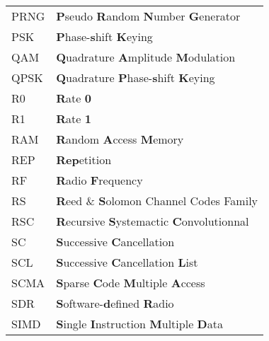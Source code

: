 \begin{center}
\begin{longtable}{ p{}  p{} }
PRNG        & \textbf{P}seudo \textbf{R}andom \textbf{N}umber \textbf{G}enerator                                              \\
PSK         & \textbf{P}hase-\textbf{s}hift \textbf{K}eying                                                                   \\
QAM         & \textbf{Q}uadrature \textbf{A}mplitude \textbf{M}odulation                                                      \\
QPSK        & \textbf{Q}uadrature \textbf{P}hase-\textbf{s}hift \textbf{K}eying                                               \\
R0          & \textbf{R}ate \textbf{0}                                                                                        \\
R1          & \textbf{R}ate \textbf{1}                                                                                        \\
RAM         & \textbf{R}andom \textbf{A}ccess \textbf{M}emory                                                                 \\
REP         & \textbf{Rep}etition                                                                                             \\
RF          & \textbf{R}adio \textbf{F}requency                                                                               \\
RS          & \textbf{R}eed \& \textbf{S}olomon Channel Codes Family                                                          \\
RSC         & \textbf{R}ecursive \textbf{S}ystemactic \textbf{C}onvolutionnal                                                 \\
SC          & \textbf{S}uccessive \textbf{C}ancellation                                                                       \\
SCL         & \textbf{S}uccessive \textbf{C}ancellation \textbf{L}ist                                                         \\
SCMA        & \textbf{S}parse \textbf{C}ode \textbf{M}ultiple \textbf{A}ccess                                                 \\
SDR         & \textbf{S}oftware-\textbf{d}efined \textbf{R}adio                                                               \\
SIMD        & \textbf{S}ingle \textbf{I}nstruction \textbf{M}ultiple \textbf{D}ata                                            \\

\end{longtable}
\end{center}

